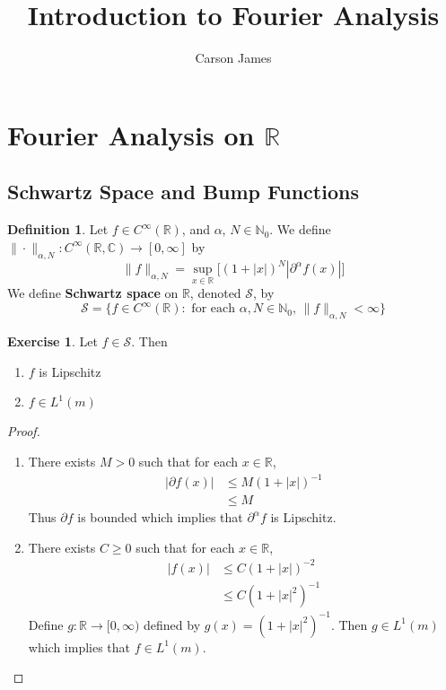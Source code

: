 \documentclass[12pt]{amsart}
\theoremstyle{definition}
\newtheorem{defn}[definition]{Definition}
\newtheorem{ex}[definition]{Exercise}
\newcommand{\p}{\partial}
\newcommand{\al}{\alpha}
\newcommand{\C}{\mathbb{C}}
\newcommand{\N}{\mathbb{N}}
\newcommand{\R}{\mathbb{R}}
\newcommand{\MS}{\mathcal{S}}
\newcommand{\RG}{[0,\infty]}
\newcommand{\Rg}{[0,\infty)}
\newcommand{\lex}[1]{\label{ex:#1}}
\newcommand{\ld}[1]{\label{defn:#1}}
\begin{document}
	
	\title{Introduction to Fourier Analysis}
	\author{Carson James}
	\maketitle
	
	\tableofcontents
	
	\newpage
	\section{Fourier Analysis on $\R$}	
	
	\subsection{Schwartz Space and Bump Functions}
	
	\begin{defn}
		\ld{101} Let $f \in C^{\infty}(\R)$, and $\al$, $N \in \N_0$. We define $\| \cdot \|_{\al, N}: C^{\infty}(\R, \C) \rightarrow \RG$ by 
		$$\|f\|_{\al, N} = \sup_{x \in \R} \bigg[  (1 + |x|)^N |\p^{\al}f (x)| \bigg] $$
		We define \textbf{Schwartz space} on $\R$, denoted $\MS$, by $$\MS = \{f \in C^{\infty}(\R): \text{ for each $\al, N \in \N_0$, } \|f\|_{\al, N} < \infty\}$$
	\end{defn}

	\begin{ex}
		\lex{102} Let $f \in \MS$. Then 
		\begin{enumerate}
			\item $f$ is Lipschitz 
			\item $ f \in  L^1(m)$
		\end{enumerate}
	\end{ex}
	
	\begin{proof}\
		\begin{enumerate}
			\item There exists $M > 0$ such that for each $x \in \R$, 
			\begin{align*}
				| \p f(x)| 
				& \leq M(1+|x|)^{-1} \\
				& \leq M
			\end{align*}
			Thus $\p f$ is bounded which implies that $\p^{\al}f$ is Lipschitz.
			\item There exists $C \geq 0$ such that for each $x \in \R$, 
			\begin{align*}
				|f(x)| 
				& \leq C(1+|x|)^{-2} \\
				& \leq C(1+|x|^2)^{-1}
			\end{align*}
			Define $g:\R \rightarrow \Rg$ defined by $g(x) = (1+|x|^2)^{-1}$. Then $g \in L^1(m)$ which implies that $f \in L^1(m)$.
		\end{enumerate}
	\end{proof}
\end{document}
